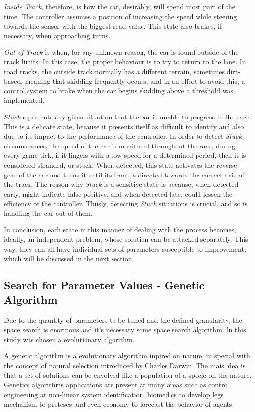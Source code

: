 	\emph{Inside Track}, therefore, is how the car, desirably, will spend most part of the time. The controller
	assumes a position of increasing the speed while steering towards the sensor with the biggest read value. This
	state also brakes, if necessary, when approaching turns.
	
	\emph{Out of Track} is when, for any unknown reason, the car is found outside of the track limits. In this case,
	the proper behaviour is to try to return to the lane. In road tracks, the outside track normally has a different
	terrain, sometimes dirt-based, meaning that skidding frequently occurs, and in an effort to avoid this, a control
	system to brake when the car begins skidding above a threshold was implemented.
	
	\emph{Stuck} represents any given situation that the car is unable to progress in the race. This is a delicate
	state, because it presents itself as difficult to identify and also due to its impact to the performance of the
	controller. In order to detect \emph{Stuck} circumstances, the speed of the car is monitored throughout the race,
	during every game tick, if it lingers with a low speed for a determined period, then it is considered stranded,
	or stuck. When detected, this state activates the reverse gear of the car and turns it until its front is
	directed towards the correct axis of the track. The reason why \emph{Stuck} is a sensitive state is because, when
	detected early, might indicate false positive, and when detected late, could lessen the efficiency of the
	controller. Thusly, detecting \textit{Stuck} situations is crucial, and so is handling the car out of them.
	
	In conclusion, each state in this manner of dealing with the process becomes, ideally, an independent problem,
	whose solution can be attacked separately. This way, they can all have individual sets of parameters susceptible
	to improvement, which will be discussed in the next section.
	
\subsection{Search for Parameter Values - Genetic Algorithm} \label{subsec:GA}
	
	Due to the quantity of parameters to be tuned and the defined granularity, the space search is enormous and it's necessary some space search algorithm. In this study was chosen a evolutionary algorithm.
	
	A genetic algorithm is a evolutionary algorithm inpired on nature, in special with the concept of natural selection introduced by Charles
	Darwin. The mais idea is that a set of solutions can be envolved like a population of a specie on the nature. Genetics algorithms applications are present at many areas such as control engineering at non-linear system identification, biomedics to develop legs mechanism to proteses and even economy to forecast the behavior of agents.
	
